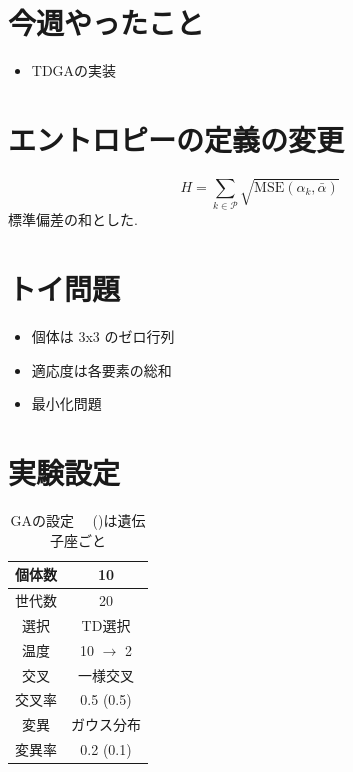 \documentclass[twocolumn]{jarticle}     %
\begin{document}


\section{今週やったこと}
\begin{itemize}
  \item TDGAの実装
\end{itemize}

\section{エントロピーの定義の変更}

\begin{equation}
  H = \sum_{k \in \mathcal{P}} \sqrt{\mathrm{MSE}( \alpha_k, \bar{\alpha} )}
\end{equation}
標準偏差の和とした.

\section{トイ問題}
\begin{itemize}
  \item 個体は 3x3 のゼロ行列
  \item 適応度は各要素の総和
  \item 最小化問題
\end{itemize}

\section{実験設定}

\begin{table}[tb]
  \begin{center}
    \caption{GAの設定 ~~()は遺伝子座ごと}
    \begin{tabular}{|c|c|} \hline
      個体数 & 10 \\ \hline
      世代数 & 20 \\ \hline \hline
      選択 & TD選択 \\ \hline
      温度 & 10 $\rightarrow$ 2 \\ \hline \hline
      交叉 & 一様交叉 \\ \hline
      交叉率 & 0.5 (0.5) \\ \hline \hline
      変異 & ガウス分布 \\ \hline
      変異率 & 0.2 (0.1) \\ \hline
    \end{tabular}
    \label{tab:setting_ga}
  \end{center}
\end{table}
\end{document}
